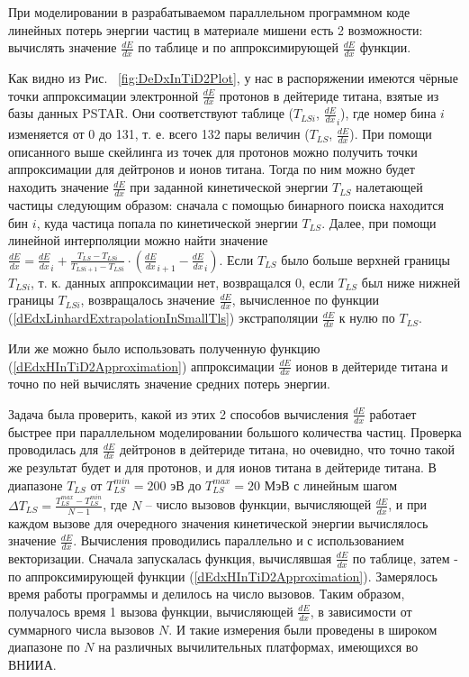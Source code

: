 \documentclass[a4paper,12pt]{article}
\begin{document}
\begin{large}
	При моделировании в разрабатываемом параллельном программном коде линейных потерь энергии частиц в материале мишени есть 2 возможности: вычислять значение $\frac{dE}{dx}$ по таблице и по аппроксимирующей $\frac{dE}{dx}$ функции.
	
	Как видно из Рис. ~\ref{fig:DeDxInTiD2Plot}, у нас в распоряжении имеются чёрные точки аппроксимации электронной $\frac{dE}{dx}$ протонов в дейтериде титана, взятые из базы данных PSTAR.
	Они соответствуют таблице ($T_{LSi}$, $\frac{dE}{dx}_i$), где номер бина $i$ изменяется от 0 до 131, т. е. всего 132 пары величин ($T_{LS}$, $\frac{dE}{dx}$).
	При помощи описанного выше скейлинга из точек для протонов можно получить точки аппроксимации для дейтронов и ионов титана.
	Тогда по ним можно будет находить значение $\frac{dE}{dx}$ при заданной кинетической энергии $T_{LS}$ налетающей частицы следующим образом: сначала с помощью бинарного поиска находится бин $i$, куда частица попала по кинетической энергии $T_{LS}$.
	Далее, при помощи линейной интерполяции можно найти значение $\frac{dE}{dx}=\frac{dE}{dx}_i+\frac{ T_{LS}-T_{LSi} }{ T_{LSi+1}-T_{LSi} } \cdot \left( \frac{dE}{dx}_{i+1}-\frac{dE}{dx}_{i} \right)$.
	Если $T_{LS}$ было больше верхней границы $T_{LSi}$, т. к. данных аппроксимации нет, возвращался 0, если $T_{LS}$ был ниже нижней границы $T_{LSi}$, возвращалось значение $\frac{dE}{dx}$, вычисленное по функции (\ref{dEdxLinhardExtrapolationInSmallTls}) экстраполяции $\frac{dE}{dx}$ к нулю по $T_{LS}$.
	
	 Или же можно было использовать полученную функцию (\ref{dEdxHInTiD2Approximation}) аппроксимации $\frac{dE}{dx}$ ионов в дейтериде титана и точно по ней вычислять значение средних потерь энергии.
	 
	 Задача была проверить, какой из этих 2 способов вычисления $\frac{dE}{dx}$ работает быстрее при параллельном моделировании большого количества частиц.
	 Проверка проводилась для $\frac{dE}{dx}$ дейтронов в дейтериде титана, но очевидно, что точно такой же результат будет и для протонов, и для ионов титана в дейтериде титана.
	 В диапазоне $T_{LS}$ от $T^{min}_{LS}=200$ эВ до $T^{max}_{LS}=20$ МэВ с линейным шагом $\Delta T_{LS}=\frac{T^{max}_{LS}-T^{min}_{LS}}{N-1}$, где $N$ -- число вызовов функции, вычисляющей $\frac{dE}{dx}$, и при каждом вызове для очередного значения кинетической энергии вычислялось значение $\frac{dE}{dx}$.
	 Вычисления проводились параллельно и с использованием векторизации.
	 Сначала запускалась функция, вычислявшая $\frac{dE}{dx}$ по таблице, затем - по аппроксимирующей функции (\ref{dEdxHInTiD2Approximation}).
	 Замерялось время работы программы и делилось на число вызовов. Таким образом, получалось время 1 вызова функции, вычисляющей $\frac{dE}{dx}$, в зависимости от суммарного числа вызовов $N$.
	 И такие измерения были проведены в широком диапазоне по $N$ на различных вычилительных платформах, имеющихся во ВНИИА.
	 

\end{large}
\end{document}
